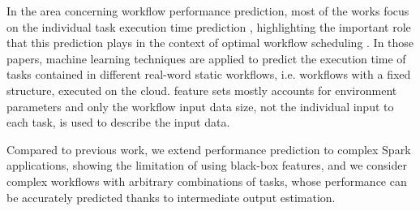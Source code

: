 \documentclass[a4paper, 10pt, conference]{ieeeconf}      %
\begin{document}
In the area concerning workflow performance prediction, most of the works focus on the individual task execution time prediction \cite{pham2017predicting, da2015online, hilman2018task}, highlighting the important role that this prediction plays in the context of optimal workflow scheduling \cite{kousalya2017workflow}. In those papers,  machine learning techniques are applied to predict the execution time of tasks contained in different real-word static workflows, i.e. workflows with a fixed structure,  executed on the cloud. feature sets mostly accounts for environment parameters and only the workflow input data size, not the individual input to each task, is used to describe the input data.

Compared to previous work, we extend performance prediction to complex Spark applications, showing the limitation of using  black-box features, and we consider complex workflows with arbitrary combinations of  tasks, whose performance can be accurately predicted thanks to intermediate output estimation.

\end{document}
